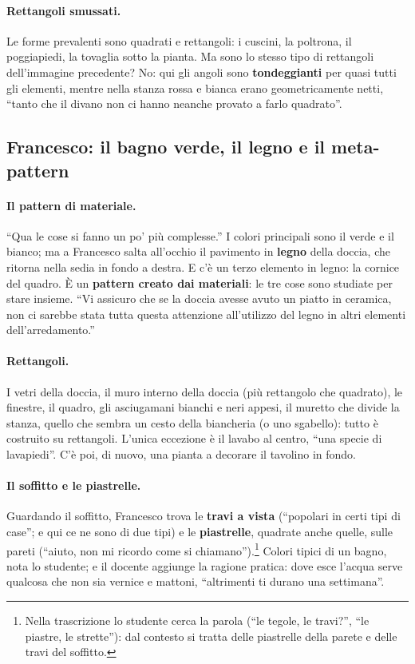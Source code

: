 \paragraph{Rettangoli smussati.} Le forme prevalenti sono quadrati e rettangoli: i
cuscini, la poltrona, il poggiapiedi, la tovaglia sotto la pianta. Ma sono lo stesso tipo
di rettangoli dell'immagine precedente? No: qui gli angoli sono \textbf{tondeggianti}
per quasi tutti gli elementi, mentre nella stanza rossa e bianca erano geometricamente
netti, ``tanto che il divano non ci hanno neanche provato a farlo quadrato''.

\subsection{Francesco: il bagno verde, il legno e il meta-pattern}

\paragraph{Il pattern di materiale.} ``Qua le cose si fanno un po' più complesse.'' I
colori principali sono il verde e il bianco; ma a Francesco salta all'occhio il
pavimento in \textbf{legno} della doccia, che ritorna nella sedia in fondo a destra. E c'è
un terzo elemento in legno: la cornice del quadro. È un \textbf{pattern creato dai
materiali}: le tre cose sono studiate per stare insieme. ``Vi assicuro che se la doccia
avesse avuto un piatto in ceramica, non ci sarebbe stata tutta questa attenzione
all'utilizzo del legno in altri elementi dell'arredamento.''

\paragraph{Rettangoli.} I vetri della doccia, il muro interno della doccia (più
rettangolo che quadrato), le finestre, il quadro, gli asciugamani bianchi e neri appesi,
il muretto che divide la stanza, quello che sembra un cesto della biancheria (o uno
sgabello): tutto è costruito su rettangoli. L'unica eccezione è il lavabo al centro,
``una specie di lavapiedi''. C'è poi, di nuovo, una pianta a decorare il tavolino in
fondo.

\paragraph{Il soffitto e le piastrelle.} Guardando il soffitto, Francesco trova le
\textbf{travi a vista} (``popolari in certi tipi di case''; e qui ce ne sono di due
tipi) e le \textbf{piastrelle}, quadrate anche quelle, sulle pareti (``aiuto, non mi
ricordo come si chiamano'').\footnote{Nella trascrizione lo studente cerca la parola
(``le tegole, le travi?'', ``le piastre, le strette''): dal contesto si tratta delle
piastrelle della parete e delle travi del soffitto.} Colori tipici di un bagno, nota
lo studente; e il docente aggiunge la ragione pratica: dove esce l'acqua serve qualcosa
che non sia vernice e mattoni, ``altrimenti ti durano una settimana''.

